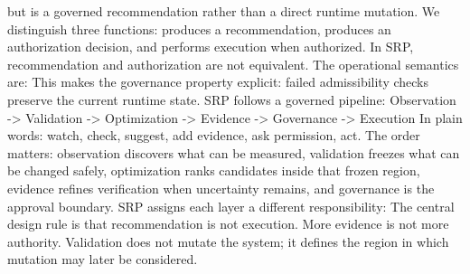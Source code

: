 {}but  is a governed recommendation rather than a direct runtime mutation.\markdownRendererParagraphSeparator
{}We distinguish three functions:\markdownRendererInterblockSeparator
{}\markdownRendererInterblockSeparator
{}produces a recommendation,\markdownRendererInterblockSeparator
{}\markdownRendererInterblockSeparator
{}produces an authorization decision, and\markdownRendererInterblockSeparator
{}\markdownRendererInterblockSeparator
{}performs execution when authorized. In SRP, recommendation and authorization are not equivalent. The operational semantics are:\markdownRendererInterblockSeparator
{}\markdownRendererInterblockSeparator
{}This makes the governance property explicit: failed admissibility checks preserve the current runtime state.\markdownRendererInterblockSeparator
{}
\markdownRendererSectionEnd \markdownRendererSectionBegin
{}\markdownRendererInterblockSeparator
{}SRP follows a governed pipeline:\markdownRendererParagraphSeparator
{}Observation -> Validation -> Optimization -> Evidence -> Governance -> Execution\markdownRendererParagraphSeparator
{}In plain words: watch, check, suggest, add evidence, ask permission, act.\markdownRendererParagraphSeparator
{}The order matters: observation discovers what can be measured, validation freezes what can be changed safely, optimization ranks candidates inside that frozen region, evidence refines verification when uncertainty remains, and governance is the approval boundary.\markdownRendererInterblockSeparator
{}
\markdownRendererSectionEnd \markdownRendererSectionBegin
{}\markdownRendererInterblockSeparator
{}SRP assigns each layer a different responsibility:\markdownRendererInterblockSeparator
{}\markdownRendererInterblockSeparator
{}The central design rule is that recommendation is not execution. More evidence is not more authority. Validation does not mutate the system; it defines the region in which mutation may later be considered.\markdownRendererParagraphSeparator
